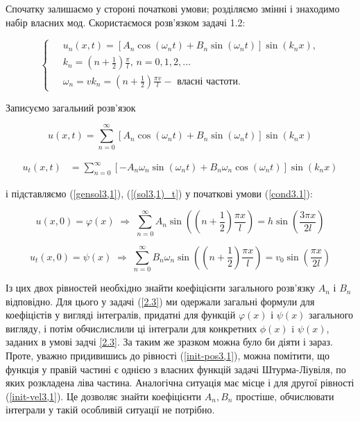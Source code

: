 Спочатку залишаємо у стороні початкові умови; розділяємо змінні і знаходимо набір власних мод. Скористаємося розв'язком задачі 1.2:

\begin{equation}
    \left\{ \begin{aligned} \label{mode3,1}
        \;&u_n(x,t) = \left[A_n\cos(\omega_n t) + B_n\sin(\omega_n t)\right] \sin(k_n x), \\
        &k_n = (n + \frac{1}{2})\frac{\pi}{l}, \, n = 0, 1, 2,\ldots\\
        &\omega_n = vk_n = (n + \frac{1}{2})\frac{\pi v}{l} - \text{ власні частоти}.
    \end{aligned}\right.
\end{equation}

Записуємо загальний розв'язок

\begin{equation} \label{gensol3,1}
    u(x,t) = \sum^{\infty}_{n=0} \left[A_n\cos(\omega_n t) + B_n\sin(\omega_n t)\right] \sin(k_n x)
\end{equation}

\begin{equation} \label{(sol3,1)_t}
    \begin{aligned}
        u_t(x,t) &= 
   \sum^{\infty}_{n=0}\left[-A_n\omega_n\sin(\omega_n t) + B_n\omega_n\cos(\omega_n t)\right] \sin(k_n x)  
    \end{aligned}
\end{equation}

і підставляємо (\ref{gensol3,1}), (\ref{(sol3,1)_t}) у початкові умови (\ref{cond3.1}):

\begin{equation} \label{init-pos3,1}
    u(x,0) = \varphi(x) \;\Rightarrow\; \sum^{\infty}_{n=0} A_n\sin\left((n + \frac{1}{2}) \frac{\pi x}{l} \right) = h \sin \left( \frac{3 \pi x}{2l} \right)
\end{equation}

\begin{equation} \label{init-vel3,1}
    u_t(x,0) = \psi(x) \;\Rightarrow\; \sum^{\infty}_{n=0} B_n \omega_n \sin\left((n + \frac{1}{2}) \frac{\pi x}{l} \right) = v_0 \sin \left( \frac{ \pi x}{2l} \right)
\end{equation}

Із цих двох рівностей необхідно знайти коефіцієнти загального розв'язку $A_n$ і $B_n$ відповідно. Для цього у задачі (\ref{2.3}) ми одержали загальні формули для коефіцієтів у вигляді інтегралів, придатні для функцій $\varphi(x)$ і $\psi(x)$ загального вигляду, і потім обчислислили ці інтеграли для конкретних $\phi(x)$ i $\psi(x)$, заданих в умові задчі \ref{2.3}. За таким же зразком можна було би діяти і зараз.  Проте, уважно придивишись до рівності (\ref{init-pos3,1}), можна помітити, що функція у правій частині є однією з власних функцій задачі Штурма-Ліувіля, по яких розкладена ліва частина. Аналогічна ситуація має місце і для другої рівності (\ref{init-vel3,1}). Це дозволяє знайти коефіцієнти $A_n, B_n$ простіше, обчислювати інтеграли у такій особливій ситуації не потрібно.


